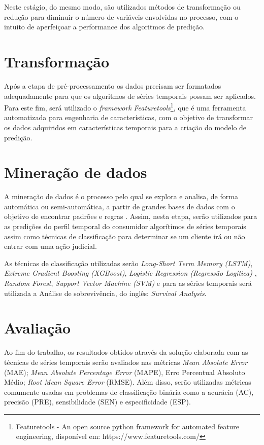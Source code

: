 \documentclass[../main.tex]{subfiles}
\begin{document}
Neste estágio, do mesmo modo, são utilizados métodos de transformação ou redução para diminuir o número de variáveis envolvidas no processo, com o intuito de  aperfeiçoar a performance   dos   algoritmos   de predição.

\section{Transformação}
Após a etapa de pré-processamento os dados precisam ser formatados adequadamente para que os algoritmos de séries temporais possam ser aplicados. Para este fim, será utilizado o \textit{framework} \textit{Featuretools}\footnote{Featuretools - An open source python framework for automated feature engineering, disponível em: https://www.featuretools.com/}, que é uma ferramenta automatizada para engenharia de características, com o objetivo de transformar os dados adquiridos em características temporais para a criação do modelo de predição.


\section{Mineração de dados}

A mineração de dados é o processo pelo qual se explora e analisa, de forma automática ou semi-automática, a partir de grandes bases de dados com o objetivo de encontrar padrões e regras \cite{han2011data}. Assim, nesta etapa, serão utilizados para as predições do perfil temporal do consumidor algorítimos de séries temporais assim como técnicas de classificação para determinar se um cliente irá ou não entrar com uma ação judicial.

As técnicas de classificação utilizadas serão \textit{Long-Short Term Memory (LSTM)}, \textit{Extreme Gradient Boosting (XGBoost)}, \textit{Logistic Regression (Regressão Logítica)} , \textit{Random Forest}, \textit{Support Vector Machine (SVM)} e para as séries temporais será utilizada a Análise de sobrevivência, do inglês: \textit{Survival Analysis}.




\section{Avaliação}
Ao fim do trabalho, os resultados obtidos através da solução elaborada com as técnicas de séries temporais serão avaliados nas métricas \textit{Mean Absolute Error} (MAE); \textit{Mean Absolute Percentage Error} (MAPE), Erro Percentual Absoluto Médio; \textit{Root Mean Square Error} (RMSE). Além disso, serão utilizadas métricas comumente usadas em problemas de classificação binária como a acurácia (AC), precisão (PRE), sensibilidade (SEN) e especificidade (ESP).

  
\end{document}
